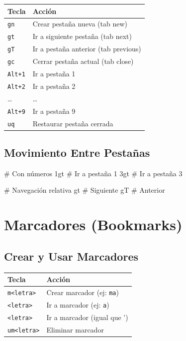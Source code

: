 \documentclass[
  doc,
  floatsintext,
  longtable,
  a4paper,
  nolmodern,
  notxfonts,
  notimes,
  12pt,
  colorlinks=true,linkcolor=blue,citecolor=blue,urlcolor=blue]{apa7}
\newenvironment{Shaded}{\begin{snugshade}}{\end{snugshade}}
\newcommand{\CommentTok}[1]{\textcolor[rgb]{0.37,0.37,0.37}{#1}}
\newcommand{\ExtensionTok}[1]{\textcolor[rgb]{0.00,0.23,0.31}{#1}}
\newcounter{none} %
\begin{document}
{\def\LTcaptype{none} %
\begin{longtable}[]{@{}ll@{}}
\toprule\noalign{}
Tecla & Acción \\
\midrule\noalign{}
\endhead
\bottomrule\noalign{}
\endlastfoot
\texttt{gn} & Crear pestaña nueva (tab new) \\
\texttt{gt} & Ir a siguiente pestaña (tab next) \\
\texttt{gT} & Ir a pestaña anterior (tab previous) \\
\texttt{gc} & Cerrar pestaña actual (tab close) \\
\texttt{Alt+1} & Ir a pestaña 1 \\
\texttt{Alt+2} & Ir a pestaña 2 \\
\ldots{} & \ldots{} \\
\texttt{Alt+9} & Ir a pestaña 9 \\
\texttt{uq} & Restaurar pestaña cerrada \\
\end{longtable}
}

\subsection{Movimiento Entre
Pestañas}\label{movimiento-entre-pestauxf1as}

\begin{Shaded}
\begin{Highlighting}[]
\CommentTok{\# Con números}
\ExtensionTok{1gt}   \CommentTok{\# Ir a pestaña 1}
\ExtensionTok{3gt}   \CommentTok{\# Ir a pestaña 3}

\CommentTok{\# Navegación relativa}
\ExtensionTok{gt}    \CommentTok{\# Siguiente}
\ExtensionTok{gT}    \CommentTok{\# Anterior}
\end{Highlighting}
\end{Shaded}

\section{Marcadores (Bookmarks)}\label{marcadores-bookmarks}

\subsection{Crear y Usar Marcadores}\label{crear-y-usar-marcadores}

{\def\LTcaptype{none} %
\begin{longtable}[]{@{}ll@{}}
\toprule\noalign{}
Tecla & Acción \\
\midrule\noalign{}
\endhead
\bottomrule\noalign{}
\endlastfoot
\texttt{m\textless{}letra\textgreater{}} & Crear marcador (ej:
\texttt{ma}) \\
\texttt{\textquotesingle{}\textless{}letra\textgreater{}} & Ir a
marcador (ej: \texttt{\textquotesingle{}a}) \\
\texttt{\textasciigrave{}\textless{}letra\textgreater{}} & Ir a marcador
(igual que ') \\
\texttt{um\textless{}letra\textgreater{}} & Eliminar marcador \\
\end{longtable}
}
\end{document}
